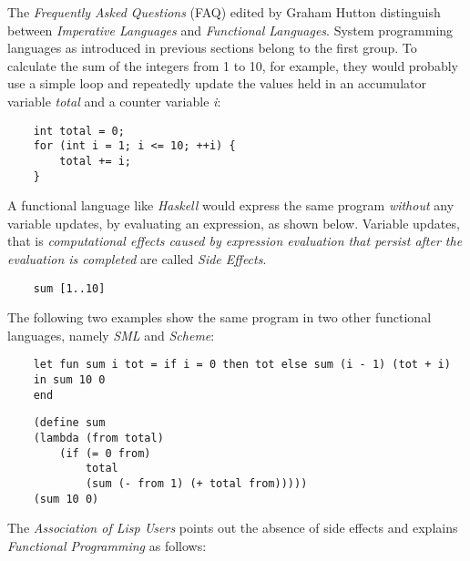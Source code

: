 The \emph{Frequently Asked Questions} (FAQ) edited by Graham Hutton \cite{hutton}
distinguish between \emph{Imperative Languages} and \emph{Functional Languages}.
System programming languages as introduced in previous sections belong to the
first group. To calculate the sum of the integers from 1 to 10, for example,
they would probably use a simple loop and repeatedly update the values held in
an accumulator variable \emph{total} and a counter variable \emph{i}:

\begin{scriptsize}
    \begin{verbatim}
    int total = 0;
    for (int i = 1; i <= 10; ++i) {
        total += i;
    }
    \end{verbatim}
\end{scriptsize}

A functional language like \emph{Haskell} would express the same program
\emph{without} any variable updates, by evaluating an expression, as shown
below. Variable updates, that is \textit{computational effects caused by
expression evaluation that persist after the evaluation is completed}
\cite{hutton} are called \emph{Side Effects}.

\begin{scriptsize}
    \begin{verbatim}
    sum [1..10]
    \end{verbatim}
\end{scriptsize}

The following two examples \cite{hutton} show the same program in two other
functional languages, namely \emph{SML} and \emph{Scheme}:

\begin{scriptsize}
    \begin{verbatim}
    let fun sum i tot = if i = 0 then tot else sum (i - 1) (tot + i)
    in sum 10 0
    end
    \end{verbatim}
\end{scriptsize}

\begin{scriptsize}
    \begin{verbatim}
    (define sum
    (lambda (from total)
        (if (= 0 from)
            total
            (sum (- from 1) (+ total from)))))
    (sum 10 0)
    \end{verbatim}
\end{scriptsize}

The \emph{Association of Lisp Users} \cite{commonlisp} points out the absence
of side effects and explains \emph{Functional Programming} as follows:

